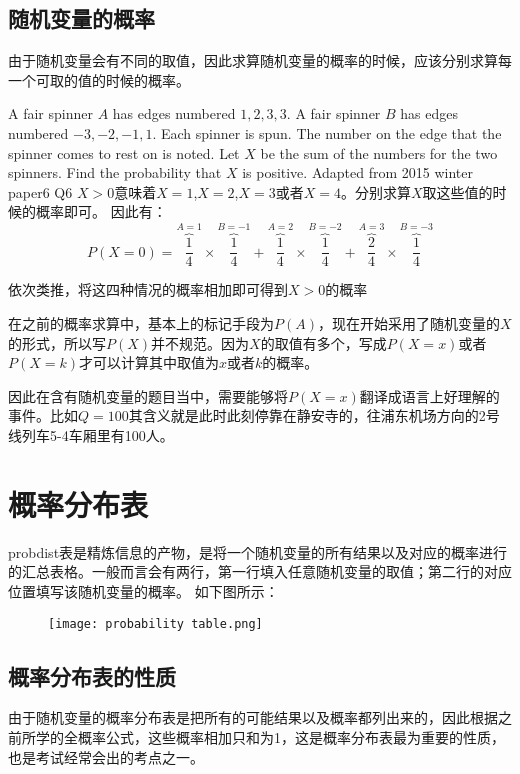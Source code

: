 \subsection*{随机变量的概率}
由于随机变量会有不同的取值，因此求算随机变量的概率的时候，应该分别求算每一个可取的值的时候的概率。
\begin{ExampleBox}
A fair spinner $A$ has edges numbered $1, 2, 3, 3$. A fair spinner $B$ has edges numbered $-3, -2, -1, 1$. Each spinner is spun. The number on the edge that the spinner comes to rest on is noted. Let $X$ be the sum of the numbers for the two spinners. Find the probability that $X$ is positive.
\makebox{}\hfill Adapted from 2015 winter paper6 Q6
\tcblower
$X>0$意味着$X=1$,$X=2$,$X=3$或者$X=4$。分别求算$X$取这些值的时候的概率即可。
因此有：
\[
P(X=0)=\overbrace{\frac{1}{4}}^{A=1}\times \overbrace{\frac{1}{4}}^{B=-1} + \overbrace{\frac{1}{4}}^{A=2}\times \overbrace{\frac{1}{4}}^{B=-2}+\overbrace{\frac{2}{4}}^{A=3}\times \overbrace{\frac{1}{4}}^{B=-3}
\]

依次类推，将这四种情况的概率相加即可得到$X>0$的概率
\end{ExampleBox}

\begin{SummBox}
在之前的概率求算中，基本上的标记手段为$P(A)$，现在开始采用了随机变量的$X$的形式，所以写$P(X)$并不规范。因为$X$的取值有多个，写成$P(X=x)$或者$P(X=k)$才可以计算其中取值为$x$或者$k$的概率。

因此在含有随机变量的题目当中，需要能够将$P(X=x)$翻译成语言上好理解的事件。比如$Q=100$其含义就是此时此刻停靠在静安寺的，往浦东机场方向的2号线列车5-4车厢里有100人。
\end{SummBox}

\clearpage

\section{概率分布表}
\gls{probdist}表是精炼信息的产物，是将一个随机变量的所有结果以及对应的概率进行的汇总表格。一般而言会有两行，第一行填入任意随机变量的取值；第二行的对应位置填写该随机变量的概率。
如下图所示：
\begin{figure}[H]
\centering
\texttt{[image: probability table.png]}
\end{figure}

\subsection*{概率分布表的性质}
\label{subsec:property}
由于随机变量的概率分布表是把所有的可能结果以及概率都列出来的，因此根据之前所学的全概率公式，这些概率相加只和为1，这是概率分布表最为重要的性质，也是考试经常会出的考点之一。

